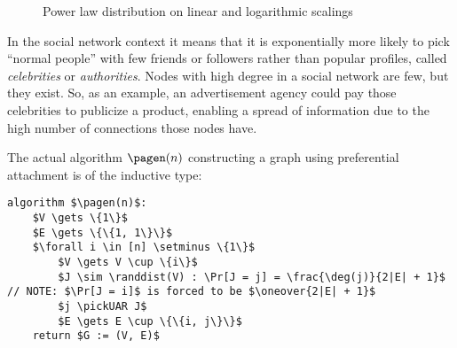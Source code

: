 \begin{figure}[ht]
    \centering
    \textwidth
    \caption{Power law distribution on linear and logarithmic scalings}
    \label{fig:power-law}
\end{figure}

In the social network context it means that it is exponentially more likely to pick ``normal people'' with few friends or followers rather than popular profiles, called \emph{celebrities} or \emph{authorities}. Nodes with high degree in a social network are few, but they exist. So, as an example, an advertisement agency could pay those celebrities to publicize a product, enabling a spread of information due to the high number of connections those nodes have.

The actual algorithm $\pagen(n)$ constructing a graph using preferential attachment is of the inductive type:

\begin{lstlisting}[caption = {The $\pagen(n)$ algorithm}, label = {lst:algopa}]
algorithm $\pagen(n)$:
    $V \gets \{1\}$
    $E \gets \{\{1, 1\}\}$
    $\forall i \in [n] \setminus \{1\}$
        $V \gets V \cup \{i\}$
        $J \sim \randdist(V) : \Pr[J = j] = \frac{\deg(j)}{2|E| + 1}$ // NOTE: $\Pr[J = i]$ is forced to be $\oneover{2|E| + 1}$
        $j \pickUAR J$
        $E \gets E \cup \{\{i, j\}\}$
    return $G := (V, E)$
\end{lstlisting}


